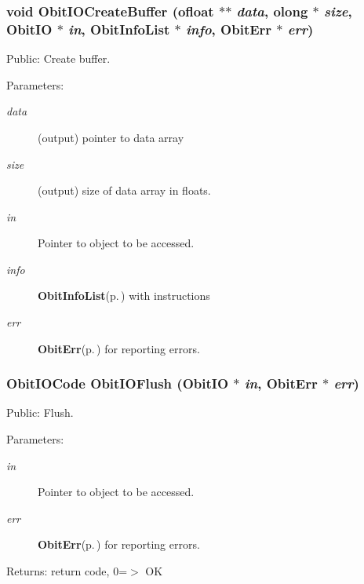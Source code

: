 \subsubsection{\setlength{\rightskip}{0pt plus 5cm}void Obit\-IOCreate\-Buffer ({\bf ofloat} $\ast$$\ast$ {\em data}, {\bf olong} $\ast$ {\em size}, {\bf Obit\-IO} $\ast$ {\em in}, {\bf Obit\-Info\-List} $\ast$ {\em info}, {\bf Obit\-Err} $\ast$ {\em err})}\label{ObitIO_8c_a28}


Public: Create buffer. 

\begin{Desc}
\item[Parameters:]
\begin{description}
\item[{\em data}](output) pointer to data array \item[{\em size}](output) size of data array in floats. \item[{\em in}]Pointer to object to be accessed. \item[{\em info}]{\bf Obit\-Info\-List}{\rm (p.\,\pageref{structObitInfoList})} with instructions \item[{\em err}]{\bf Obit\-Err}{\rm (p.\,\pageref{structObitErr})} for reporting errors. \end{description}
\end{Desc}
\subsubsection{\setlength{\rightskip}{0pt plus 5cm}Obit\-IOCode Obit\-IOFlush ({\bf Obit\-IO} $\ast$ {\em in}, {\bf Obit\-Err} $\ast$ {\em err})}\label{ObitIO_8c_a27}


Public: Flush. 

\begin{Desc}
\item[Parameters:]
\begin{description}
\item[{\em in}]Pointer to object to be accessed. \item[{\em err}]{\bf Obit\-Err}{\rm (p.\,\pageref{structObitErr})} for reporting errors. \end{description}
\end{Desc}
\begin{Desc}
\item[Returns:]return code, 0=$>$ OK \end{Desc}
